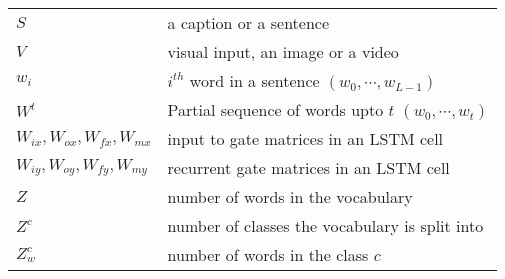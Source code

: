 \begin{longtable}{@{}p{}p{}@{}}
        $S$ & a caption or a sentence\\
        $V$   & visual input, an image or a video\\
        $w_i$   & $i^{th}$ word in a sentence $(w_0,\cdots,w_{L-1})$\\
        $W^t$ & Partial sequence of words upto $t$ $(w_0,\cdots,w_t)$\\
        $W_{ix},W_{ox},W_{fx}, W_{mx}$ & input to gate matrices in an LSTM cell \\
        $W_{iy},W_{oy},W_{fy}, W_{my}$ & recurrent gate matrices in an LSTM cell \\
        $Z$   &  number of words in the vocabulary\\
        $Z^c$   & number of classes the vocabulary is split into\\
        $Z_w^c$   & number of words in the class $c$\\

\end{longtable}
